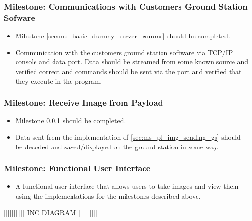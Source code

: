 	\subsubsection{Milestone: Communications with Customers Ground Station Sofware}
		\label{sec:ms_gs_basestation_comms}
		\begin{itemize}
			\item 	Milestone \ref{sec:ms_basic_dummy_server_comms} should be
				completed.
			\item 	Communication with the customers ground station software via TCP/IP console and
				data port. Data should be streamed from some known source and verified correct and
				commands should be sent via the port and verified that they execute in the program.
		\end{itemize}

	\subsubsection{Milestone: Receive Image from Payload}
		\label{sec:ms_gs_recieve_image}
		\begin{itemize}
			\item 	Milestone \ref{sec:ms_gs_basestation_comms} should be completed.
			\item 	Data sent from the implementation of \ref{sec:ms_pl_img_sending_gs} should be
				decoded and saved/displayed on the ground station in some way.
		\end{itemize}


	\subsubsection{Milestone: Functional User Interface}
		\begin{itemize}
			\item 	A functional user interface that allows users to take images and view them using the implementations
				for the milestones described above.
		\end{itemize}



||||||||||| INC DIAGRAM |||||||||||||||